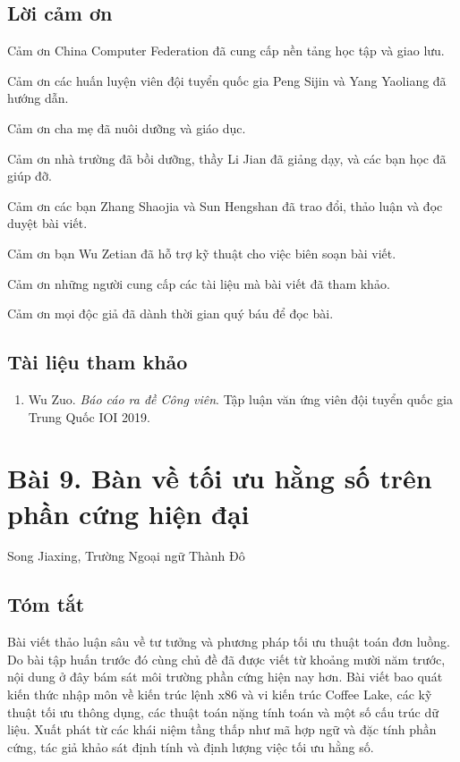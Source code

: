 \documentclass[11pt]{article}
\begin{document}
\subsection*{Lời cảm ơn}

Cảm ơn China Computer Federation đã cung cấp nền tảng học tập và giao lưu.

Cảm ơn các huấn luyện viên đội tuyển quốc gia Peng Sijin và Yang Yaoliang đã
hướng dẫn.

Cảm ơn cha mẹ đã nuôi dưỡng và giáo dục.

Cảm ơn nhà trường đã bồi dưỡng, thầy Li Jian đã giảng dạy, và các bạn học đã
giúp đỡ.

Cảm ơn các bạn Zhang Shaojia và Sun Hengshan đã trao đổi, thảo luận và đọc
duyệt bài viết.

Cảm ơn bạn Wu Zetian đã hỗ trợ kỹ thuật cho việc biên soạn bài viết.

Cảm ơn những người cung cấp các tài liệu mà bài viết đã tham khảo.

Cảm ơn mọi độc giả đã dành thời gian quý báu để đọc bài.

\subsection*{Tài liệu tham khảo}

\begin{enumerate}
  \item Wu Zuo. \emph{Báo cáo ra đề Công viên}. Tập luận văn ứng viên đội tuyển
  quốc gia Trung Quốc IOI 2019.
\end{enumerate}

\section*{Bài 9. Bàn về tối ưu hằng số trên phần cứng hiện đại}

\begin{center}
Song Jiaxing, Trường Ngoại ngữ Thành Đô
\end{center}

\subsection*{Tóm tắt}

Bài viết thảo luận sâu về tư tưởng và phương pháp tối ưu thuật toán đơn luồng.
Do bài tập huấn trước đó cùng chủ đề đã được viết từ khoảng mười năm trước,
nội dung ở đây bám sát môi trường phần cứng hiện nay hơn. Bài viết bao quát
kiến thức nhập môn về kiến trúc lệnh x86 và vi kiến trúc Coffee Lake, các kỹ
thuật tối ưu thông dụng, các thuật toán nặng tính toán và một số cấu trúc dữ
liệu. Xuất phát từ các khái niệm tầng thấp như mã hợp ngữ và đặc tính phần
cứng, tác giả khảo sát định tính và định lượng việc tối ưu hằng số.
\end{document}
